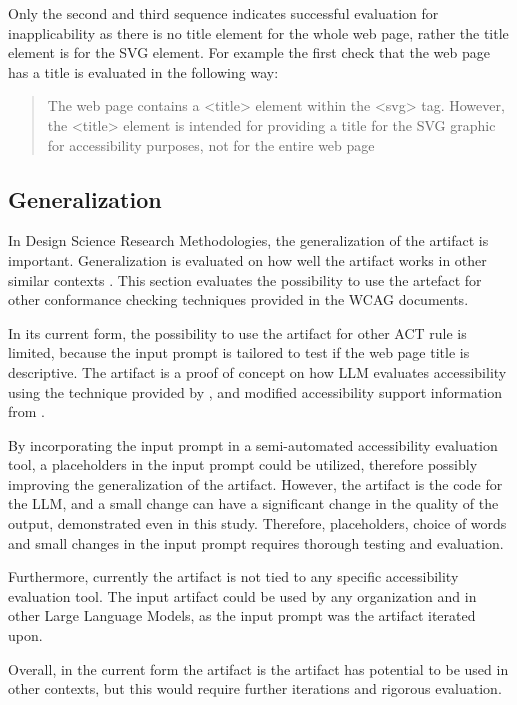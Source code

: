 Only the second and third sequence indicates successful evaluation for inapplicability as there is no title element for the whole web page, rather the title element is for the SVG element. For example the first check that the web page has a title is evaluated in the following way: \blockquote{The web page contains a <title> element within the <svg> tag. However, the <title> element is intended for providing a title for the SVG graphic for accessibility purposes, not for the entire web page}.


\subsection{Generalization}

In Design Science Research Methodologies, the generalization of the artifact is important. Generalization is evaluated on how well the artifact works in other similar contexts \citep{design_science_eval}. This section evaluates the possibility to use the artefact for other conformance checking techniques provided in the WCAG documents.

In its current form, the possibility to use the artifact for other ACT rule is limited, because the input prompt is  tailored to test if the web page title is descriptive. The artifact is a proof of concept on how LLM evaluates accessibility using the technique provided by \textcite{g88}, and modified accessibility support information from \textcite{act_rule_g88}. 

By incorporating the input prompt in a semi-automated accessibility evaluation tool, a placeholders in the input prompt could be utilized, therefore possibly improving the generalization of the artifact. However, the artifact is the code for the LLM, and a small change can have a significant change in the quality of the output, demonstrated even in this study. Therefore, placeholders, choice of words and small changes in the input prompt requires thorough testing and evaluation.

Furthermore, currently the artifact is not tied to any specific accessibility evaluation tool. The input artifact could be used by any organization and in other Large Language Models, as the input prompt was the artifact iterated upon.

Overall, in the current form the artifact is the artifact has potential to be used in other contexts, but this would require further iterations and rigorous evaluation.

